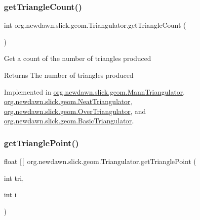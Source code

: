 \mbox{\label{interfaceorg_1_1newdawn_1_1slick_1_1geom_1_1_triangulator_a7a5d68a694f2b80878c48563b5ea6f1f}} 
\subsubsection{\texorpdfstring{get\+Triangle\+Count()}{getTriangleCount()}}
{\footnotesize\ttfamily int org.\+newdawn.\+slick.\+geom.\+Triangulator.\+get\+Triangle\+Count (\begin{DoxyParamCaption}{ }\end{DoxyParamCaption})}

Get a count of the number of triangles produced

\begin{DoxyReturn}{Returns}
The number of triangles produced 
\end{DoxyReturn}


Implemented in \mbox{\hyperlink{classorg_1_1newdawn_1_1slick_1_1geom_1_1_mann_triangulator_a3d982150cac3d36cd7c22e146e6c48b3}{org.\+newdawn.\+slick.\+geom.\+Mann\+Triangulator}}, \mbox{\hyperlink{classorg_1_1newdawn_1_1slick_1_1geom_1_1_neat_triangulator_a9974151d5e703dc37326ac89f8db1de1}{org.\+newdawn.\+slick.\+geom.\+Neat\+Triangulator}}, \mbox{\hyperlink{classorg_1_1newdawn_1_1slick_1_1geom_1_1_over_triangulator_a465acf51a252501448c8f29fa05c07ce}{org.\+newdawn.\+slick.\+geom.\+Over\+Triangulator}}, and \mbox{\hyperlink{classorg_1_1newdawn_1_1slick_1_1geom_1_1_basic_triangulator_a1deef9bca53fc40ff881923133bb22b1}{org.\+newdawn.\+slick.\+geom.\+Basic\+Triangulator}}.

\mbox{\label{interfaceorg_1_1newdawn_1_1slick_1_1geom_1_1_triangulator_a0142ec1a5f11292813f0f4e9a1407efb}} 
\subsubsection{\texorpdfstring{get\+Triangle\+Point()}{getTrianglePoint()}}
{\footnotesize\ttfamily float \mbox{[}$\,$\mbox{]} org.\+newdawn.\+slick.\+geom.\+Triangulator.\+get\+Triangle\+Point (\begin{DoxyParamCaption}\item[{int}]{tri,  }\item[{int}]{i }\end{DoxyParamCaption})}

